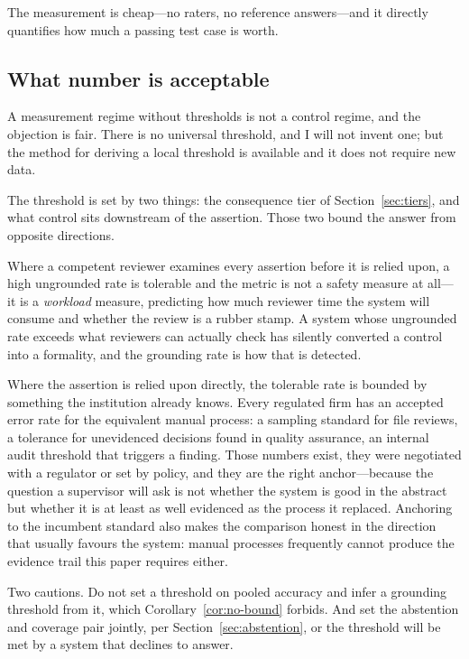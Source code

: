 \documentclass[11pt]{article}
\theoremstyle{plain}
\theoremstyle{definition}
\begin{document}
The measurement is cheap---no raters, no reference answers---and it directly quantifies how much
a passing test case is worth.

\subsection{What number is acceptable}
\label{sec:thresholds}

A measurement regime without thresholds is not a control regime, and the objection is
fair. There is no universal threshold, and I will not invent one; but the method for
deriving a local threshold is available and it does not require new data.

The threshold is set by two things: the consequence tier of
Section~\ref{sec:tiers}, and what control sits downstream of the assertion. Those two
bound the answer from opposite directions.

Where a competent reviewer examines every assertion before it is relied upon, a high
ungrounded rate is tolerable and the metric is not a safety measure at all---it is a
\emph{workload} measure, predicting how much reviewer time the system will consume and
whether the review is a rubber stamp. A system whose ungrounded rate exceeds what
reviewers can actually check has silently converted a control into a formality, and the
grounding rate is how that is detected.

Where the assertion is relied upon directly, the tolerable rate is bounded by something
the institution already knows. Every regulated firm has an accepted error rate for the
equivalent manual process: a sampling standard for file reviews, a tolerance for
unevidenced decisions found in quality assurance, an internal audit threshold that
triggers a finding. Those numbers exist, they were negotiated with a regulator or set by
policy, and they are the right anchor---because the question a supervisor will ask is not
whether the system is good in the abstract but whether it is at least as well evidenced
as the process it replaced. Anchoring to the incumbent standard also makes the comparison
honest in the direction that usually favours the system: manual processes frequently
cannot produce the evidence trail this paper requires either.

Two cautions. Do not set a threshold on pooled accuracy and infer a grounding threshold
from it, which Corollary~\ref{cor:no-bound} forbids. And set the abstention and coverage
pair jointly, per Section~\ref{sec:abstention}, or the threshold will be met by a system
that declines to answer.
\end{document}

